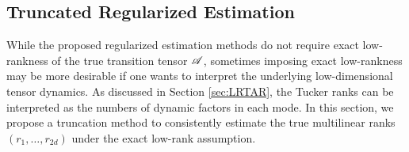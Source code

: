 \documentclass[12pt]{article}
\newtheorem{definition}{Definition}
\newcommand{\bm}{\boldsymbol}
\newcommand{\cm}[1]{\mbox{\boldmath$\mathscr{#1}$}}
\begin{document}

\subsection{Truncated Regularized Estimation \label{subsec:trunc}}
While the proposed regularized estimation methods do not require exact low-rankness of the true transition tensor $\cm{A}$, sometimes imposing exact low-rankness may be more desirable if one wants to interpret the underlying low-dimensional tensor dynamics. As  discussed in Section \ref{sec:LRTAR}, the Tucker ranks can be interpreted as the numbers of dynamic factors in each mode. In this section, we propose a truncation method to consistently estimate the true multilinear ranks $(r_1, \dots, r_{2d})$ under the exact low-rank assumption.
\end{document}
